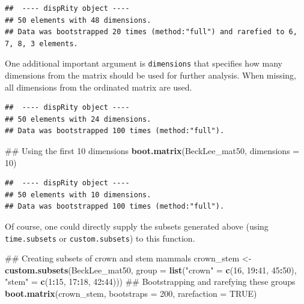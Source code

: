 \documentclass[]{book}
\newenvironment{Shaded}{\begin{snugshade}}{\end{snugshade}}
\newcommand{\KeywordTok}[1]{\textcolor[rgb]{0.13,0.29,0.53}{\textbf{#1}}}
\newcommand{\DataTypeTok}[1]{\textcolor[rgb]{0.13,0.29,0.53}{#1}}
\newcommand{\DecValTok}[1]{\textcolor[rgb]{0.00,0.00,0.81}{#1}}
\newcommand{\FloatTok}[1]{\textcolor[rgb]{0.00,0.00,0.81}{#1}}
\newcommand{\StringTok}[1]{\textcolor[rgb]{0.31,0.60,0.02}{#1}}
\newcommand{\OtherTok}[1]{\textcolor[rgb]{0.56,0.35,0.01}{#1}}
\newcommand{\OperatorTok}[1]{\textcolor[rgb]{0.81,0.36,0.00}{\textbf{#1}}}
\newcommand{\NormalTok}[1]{#1}
\theoremstyle{definition}
\theoremstyle{definition}
\theoremstyle{remark}
\begin{document}
\begin{verbatim}
##  ---- dispRity object ---- 
## 50 elements with 48 dimensions.
## Data was bootstrapped 20 times (method:"full") and rarefied to 6, 7, 8, 3 elements.
\end{verbatim}

One additional important argument is \texttt{dimensions} that specifies
how many dimensions from the matrix should be used for further analysis.
When missing, all dimensions from the ordinated matrix are used.

\begin{Shaded}
\end{Shaded}

\begin{verbatim}
##  ---- dispRity object ---- 
## 50 elements with 24 dimensions.
## Data was bootstrapped 100 times (method:"full").
\end{verbatim}

\begin{Shaded}
\begin{Highlighting}[]
\NormalTok{## Using the first 10 dimensions}
\KeywordTok{boot.matrix}\NormalTok{(BeckLee_mat50, }\DataTypeTok{dimensions =} \DecValTok{10}\NormalTok{)}
\end{Highlighting}
\end{Shaded}

\begin{verbatim}
##  ---- dispRity object ---- 
## 50 elements with 10 dimensions.
## Data was bootstrapped 100 times (method:"full").
\end{verbatim}

Of course, one could directly supply the subsets generated above (using
\texttt{time.subsets} or \texttt{custom.subsets}) to this function.

\begin{Shaded}
\begin{Highlighting}[]
\NormalTok{## Creating subsets of crown and stem mammals}
\NormalTok{crown_stem <-}\StringTok{ }\KeywordTok{custom.subsets}\NormalTok{(BeckLee_mat50,}
                                \DataTypeTok{group =} \KeywordTok{list}\NormalTok{(}\StringTok{"crown"}\NormalTok{ =}\StringTok{ }\KeywordTok{c}\NormalTok{(}\DecValTok{16}\NormalTok{, }\DecValTok{19}\OperatorTok{:}\DecValTok{41}\NormalTok{, }\DecValTok{45}\OperatorTok{:}\DecValTok{50}\NormalTok{), }
                                             \StringTok{"stem"}\NormalTok{ =}\StringTok{ }\KeywordTok{c}\NormalTok{(}\DecValTok{1}\OperatorTok{:}\DecValTok{15}\NormalTok{, }\DecValTok{17}\OperatorTok{:}\DecValTok{18}\NormalTok{, }\DecValTok{42}\OperatorTok{:}\DecValTok{44}\NormalTok{)))}
\NormalTok{## Bootstrapping and rarefying these groups}
\KeywordTok{boot.matrix}\NormalTok{(crown_stem, }\DataTypeTok{bootstraps =} \DecValTok{200}\NormalTok{, }\DataTypeTok{rarefaction =} \OtherTok{TRUE}\NormalTok{)}
\end{Highlighting}
\end{Shaded}
\end{document}
